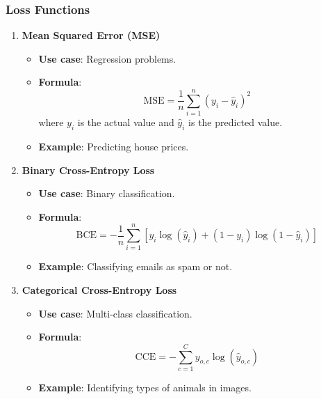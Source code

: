 \documentclass[aspectratio=169]{beamer}
\begin{document}
\begin{frame}
    \frametitle{Loss Functions}
    \begin{enumerate}
        \item \textbf{Mean Squared Error (MSE)}
        \begin{itemize}
            \item \textbf{Use case}: Regression problems.
            \item \textbf{Formula}:
            \begin{equation}
            \text{MSE} = \frac{1}{n} \sum_{i=1}^{n} (y_i - \hat{y}_i)^2
            \end{equation}
            where \( y_i \) is the actual value and \( \hat{y}_i \) is the predicted value.
            \item \textbf{Example}: Predicting house prices.
        \end{itemize}
        
        \item \textbf{Binary Cross-Entropy Loss}
        \begin{itemize}
            \item \textbf{Use case}: Binary classification.
            \item \textbf{Formula}:
            \begin{equation}
            \text{BCE} = -\frac{1}{n} \sum_{i=1}^{n} [y_i \log(\hat{y}_i) + (1-y_i) \log(1-\hat{y}_i)]
            \end{equation}
            \item \textbf{Example}: Classifying emails as spam or not.
        \end{itemize}
        
        \item \textbf{Categorical Cross-Entropy Loss}
        \begin{itemize}
            \item \textbf{Use case}: Multi-class classification.
            \item \textbf{Formula}:
            \begin{equation}
            \text{CCE} = -\sum_{c=1}^{C} y_{o,c} \log(\hat{y}_{o,c})
            \end{equation}
            \item \textbf{Example}: Identifying types of animals in images.
        \end{itemize}
    \end{enumerate}
\end{frame}
\end{document}

